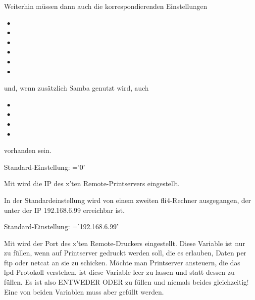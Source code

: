\begin{description}
    Weiterhin müssen dann auch die korrespondierenden Einstellungen

\begin{itemize}
\item {}
\item {}
\item {}
\item {}
\item {}
\item {}
\end{itemize}

    und, wenn zusätzlich Samba genutzt wird, auch

\begin{itemize}
\item {}
\item {}
\item {}
\item {}
\end{itemize}

    vorhanden sein.

    Standard-Einstellung: ='0'



    Mit  wird die IP des x'ten Remote-Printservers
    eingestellt.

    In der Standardeinstellung wird von einem zweiten fli4-Rechner
    ausgegangen, der unter der IP 192.168.6.99 erreichbar ist.

    Standard-Einstellung: ='192.168.6.99'



    Mit  wird der Port des x'ten Remote-Druckers
    eingestellt.
    Diese Variable ist nur zu füllen, wenn auf Printserver gedruckt werden soll,
    die es erlauben, Daten per ftp oder netcat an sie zu schicken.
    Möchte man Printserver ansteuern, die das lpd-Protokoll verstehen, ist
    diese Variable leer zu lassen und statt dessen 
    zu füllen.
    Es ist also ENTWEDER  ODER
     zu füllen und niemals
    beides gleichzeitig! Eine von beiden Variablen muss aber gefüllt werden.


\end{description}
